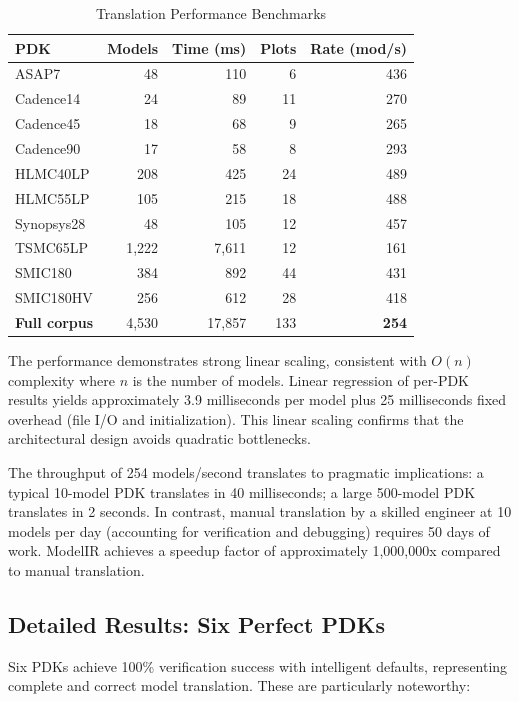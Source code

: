 \documentclass[10pt,twocolumn]{article}
\begin{document}
\begin{table}[!t]
\caption{Translation Performance Benchmarks}
\label{tab:performance}
\centering
\renewcommand{\arraystretch}{1.15}
\begin{tabular}{@{}lrrrr@{}}
\toprule
\textbf{PDK} & \textbf{Models} & \textbf{Time (ms)} & \textbf{Plots} & \textbf{Rate (mod/s)} \\
\midrule
ASAP7 & 48 & 110 & 6 & 436 \\
Cadence14 & 24 & 89 & 11 & 270 \\
Cadence45 & 18 & 68 & 9 & 265 \\
Cadence90 & 17 & 58 & 8 & 293 \\
HLMC40LP & 208 & 425 & 24 & 489 \\
HLMC55LP & 105 & 215 & 18 & 488 \\
Synopsys28 & 48 & 105 & 12 & 457 \\
TSMC65LP & 1,222 & 7,611 & 12 & 161 \\
SMIC180 & 384 & 892 & 44 & 431 \\
SMIC180HV & 256 & 612 & 28 & 418 \\
\midrule
\textbf{Full corpus} & 4,530 & 17,857 & 133 & \textbf{254} \\
\bottomrule
\end{tabular}
\end{table}

The performance demonstrates strong linear scaling, consistent with $O(n)$ complexity where $n$ is the number of models. Linear regression of per-PDK results yields approximately 3.9 milliseconds per model plus 25 milliseconds fixed overhead (file I/O and initialization). This linear scaling confirms that the architectural design avoids quadratic bottlenecks.

The throughput of 254 models/second translates to pragmatic implications: a typical 10-model PDK translates in 40 milliseconds; a large 500-model PDK translates in 2 seconds. In contrast, manual translation by a skilled engineer at 10 models per day (accounting for verification and debugging) requires 50 days of work. ModelIR achieves a speedup factor of approximately 1,000,000x compared to manual translation.

\subsection{Detailed Results: Six Perfect PDKs}

Six PDKs achieve 100\% verification success with intelligent defaults, representing complete and correct model translation. These are particularly noteworthy:
\end{document}

